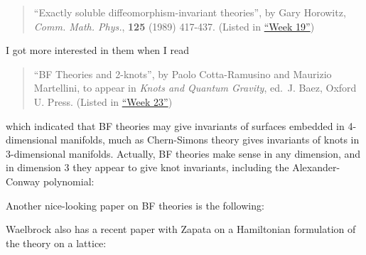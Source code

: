 \documentclass{article}
\def\tightlist{}
\renewcommand{\texttt}[1]{%
  \begingroup
  \ttfamily
  \begingroup\lccode`~=`/\lowercase{\endgroup\def~}{/\discretionary{}{}{}}%
  \begingroup\lccode`~=`[\lowercase{\endgroup\def~}{[\discretionary{}{}{}}%
  \begingroup\lccode`~=`.\lowercase{\endgroup\def~}{.\discretionary{}{}{}}%
  \catcode`/=\active\catcode`[=\active\catcode`.=\active
  \scantokens{#1\noexpand}%
  \endgroup
}
\begin{document}
\begin{quote}
``Exactly soluble diffeomorphism-invariant theories'', by Gary Horowitz,
\emph{Comm. Math. Phys.}, \textbf{125} (1989) 417-437. (Listed in
\protect\hyperlink{week19}{``Week 19''})
\end{quote}

I got more interested in them when I read

\begin{quote}
``BF Theories and 2-knots'', by Paolo Cotta-Ramusino and Maurizio
Martellini, to appear in \emph{Knots and Quantum Gravity}, ed.~J. Baez,
Oxford U. Press. (Listed in \protect\hyperlink{week23}{``Week 23''})
\end{quote}

which indicated that BF theories may give invariants of surfaces
embedded in 4-dimensional manifolds, much as Chern-Simons theory gives
invariants of knots in 3-dimensional manifolds. Actually, BF theories
make sense in any dimension, and in dimension 3 they appear to give knot
invariants, including the Alexander-Conway polynomial:


Another nice-looking paper on BF theories is the following:


Waelbrock also has a recent paper with Zapata on a Hamiltonian
formulation of the theory on a lattice:

\end{document}
